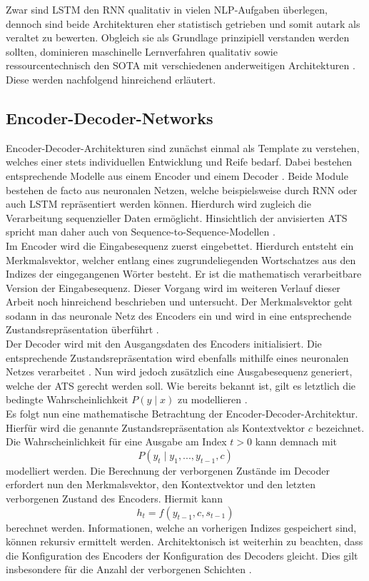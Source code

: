 \noindent
Zwar sind \ac{LSTM} den \ac{RNN} qualitativ in vielen \ac{NLP}-Aufgaben überlegen, dennoch sind beide Architekturen eher statistisch getrieben und somit autark als veraltet zu bewerten. Obgleich sie als Grundlage prinzipiell verstanden werden sollten, dominieren maschinelle Lernverfahren qualitativ sowie ressourcentechnisch den \ac{SOTA} mit verschiedenen anderweitigen Architekturen \cite{CUR18}. Diese werden nachfolgend hinreichend erläutert.


\subsection{Encoder-Decoder-Networks}
\noindent
Encoder-Decoder-Architekturen sind zunächst einmal als Template zu verstehen, welches einer stets individuellen Entwicklung und Reife bedarf. Dabei bestehen entsprechende Modelle aus einem Encoder und einem Decoder \cite[S.~375-376]{ZHA20}. Beide Module bestehen de facto aus neuronalen Netzen, welche beispielsweise durch \ac{RNN} oder auch \ac{LSTM} repräsentiert werden können. Hierdurch wird zugleich die Verarbeitung sequenzieller Daten ermöglicht. Hinsichtlich der anvisierten \ac{ATS} spricht man daher auch von Sequence-to-Sequence-Modellen \cite[S.~377]{ZHA20}.\\

\noindent
Im Encoder wird die Eingabesequenz zuerst eingebettet. Hierdurch entsteht ein Merkmalsvektor, welcher entlang eines zugrundeliegenden Wortschatzes aus den Indizes der eingegangenen Wörter besteht. Er ist die mathematisch verarbeitbare Version der Eingabesequenz. Dieser Vorgang wird im weiteren Verlauf dieser Arbeit noch hinreichend beschrieben und untersucht. Der Merkmalsvektor geht sodann in das neuronale Netz des Encoders ein und wird in eine entsprechende Zustandsrepräsentation überführt \cite{YAN19}.\\

\noindent
Der Decoder wird mit den Ausgangsdaten des Encoders initialisiert. Die entsprechende Zustandsrepräsentation wird ebenfalls mithilfe eines neuronalen Netzes verarbeitet \cite[S.379]{ZHA20}. Nun wird jedoch zusätzlich eine Ausgabesequenz generiert, welche der \ac{ATS} gerecht werden soll. Wie bereits bekannt ist, gilt es letztlich die bedingte Wahrscheinlichkeit $P(y \mid x)$ zu modellieren \cite{YAN19}.\\

\noindent
Es folgt nun eine mathematische Betrachtung der Encoder-Decoder-Architektur. Hierfür wird die genannte Zustandsrepräsentation als Kontextvektor $c$ bezeichnet. Die Wahrscheinlichkeit für eine Ausgabe am Index $t > 0$ kann demnach mit $$P(y_t \mid y_1, ..., y_{t-1}, c)$$ modelliert werden. Die Berechnung der verborgenen Zustände im Decoder erfordert nun den Merkmalsvektor, den Kontextvektor und den letzten verborgenen Zustand des Encoders. Hiermit kann $$h_t = f(y_{t-1}, c, s_{t-1})$$ berechnet werden. Informationen, welche an vorherigen Indizes gespeichert sind, können rekursiv ermittelt werden. Architektonisch ist weiterhin zu beachten, dass die Konfiguration des Encoders der Konfiguration des Decoders gleicht. Dies gilt insbesondere für die Anzahl der verborgenen Schichten \cite[S.~379]{ZHA20}.\\

